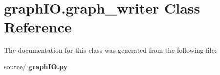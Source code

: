 \section{graph\+I\+O.\+graph\+\_\+writer Class Reference}
\label{classgraph_i_o_1_1graph__writer}


The documentation for this class was generated from the following file\+:\begin{DoxyCompactItemize}
\item 
source/\textbf{ graph\+I\+O.\+py}\end{DoxyCompactItemize}
